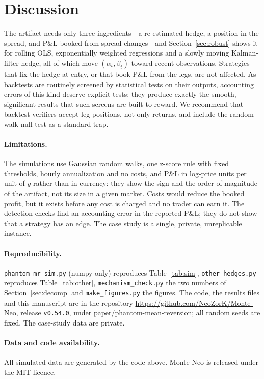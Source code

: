 \documentclass[11pt]{article}
\theoremstyle{remark}
\begin{document}
\section{Discussion}

The artifact needs only three ingredients---a re-estimated hedge, a position in the spread, and P\&L booked from
spread changes---and Section~\ref{sec:robust} shows it for rolling OLS, exponentially weighted regressions and a
slowly moving Kalman-filter hedge, all of which move $(\alpha_t,\beta_t)$ toward recent observations. Strategies that
fix the hedge at entry, or that book P\&L from the legs, are not affected. As backtests are
routinely screened by statistical tests on their outputs, accounting errors of this kind deserve explicit tests:
they produce exactly the smooth, significant results that such screens are built to reward. We recommend that backtest verifiers accept leg positions, not only returns, and
include the random-walk null test as a standard trap.

\paragraph{Limitations.} The simulations use Gaussian random walks, one z-score rule with fixed thresholds, hourly
annualization and no costs, and P\&L in log-price units per unit of $y$ rather than in currency: they show the sign and the order of magnitude of the artifact, not its size in a given
market. Costs would reduce the booked profit, but it exists before any cost is charged and no trader can earn it. The detection checks find an accounting
error in the reported P\&L; they do not show that a strategy has an edge. The case study is a single, private, unreplicable instance.

\paragraph{Reproducibility.} \texttt{phantom\_mr\_sim.py} (numpy only) reproduces Table~\ref{tab:sim},
\texttt{other\_hedges.py} reproduces Table~\ref{tab:other}, \texttt{mechanism\_check.py} the two numbers of Section~\ref{sec:decomp} and \texttt{make\_figures.py} the figures. The code, the results files and this manuscript are in the repository
\url{https://github.com/NeoZorK/Monte-Neo}, release \texttt{v0.54.0}, under
\url{paper/phantom-mean-reversion}; all random seeds are fixed. The case-study data are private.

\paragraph{Data and code availability.} All simulated data are generated by the code above. Monte-Neo is released under the MIT licence.
\end{document}
